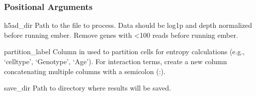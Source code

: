 \documentclass[letterpaper,10pt,english]{sphinxmanual}
\begin{document}
\begin{sphinxVerbatim}[commandchars=\\\{\}]
  \PYG{p}{[}\PYG{p}{]} \PYG{p}{[}\PYG{p}{]} \PYG{p}{[} \PYG{p}{]} \PYG{p}{[} \PYG{p}{]} \PYG{p}{[} \PYG{p}{]}
                  \PYG{p}{[} \PYG{p}{]} \PYG{p}{[}\PYG{p}{]} \PYG{p}{[} \PYG{p}{]} \PYG{p}{[}\PYG{p}{]} \PYG{p}{[}\PYG{p}{]} \PYG{p}{[} \PYG{p}{]}
                  \PYG{p}{[} \PYG{p}{]} \PYG{p}{[} \PYG{p}{]}
                    
\end{sphinxVerbatim}


\subsubsection{Positional Arguments}
\label{\detokenize{cli:positional-arguments}}\begin{optionlist}{3cm}
\item [h5ad\_dir]  
\sphinxAtStartPar
Path to the  file to process. Data should be log1p and depth normalized before running ember. Remove genes with \textless{}100 reads before running ember.
\item [partition\_label]  
\sphinxAtStartPar
Column in  used to partition cells for entropy calculations (e.g., ‘celltype’, ‘Genotype’, ‘Age’). For interaction terms, create a new column concatenating multiple  columns with a semicolon (:).
\item [save\_dir]  
\sphinxAtStartPar
Path to directory where results will be saved.
\end{optionlist}
\end{document}
